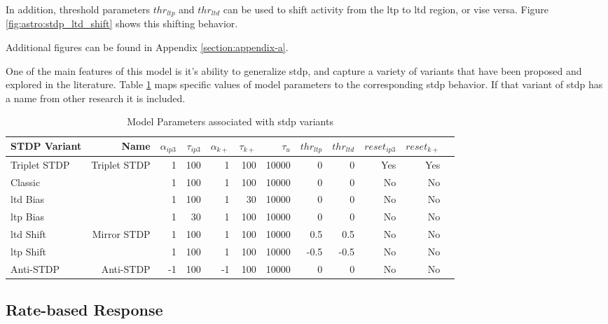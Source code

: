 
In addition, threshold parameters $thr_{ltp}$ and $thr_{ltd}$ can be used to
shift activity from the \gls{ltp} to \gls{ltd} region, or vise versa. Figure
\ref{fig:astro:stdp_ltd_shift} shows this shifting behavior.


Additional figures can be found in Appendix \ref{section:appendix-a}.

One of the main features of this model is it's ability to generalize \gls{stdp},
and capture a variety of variants that have been proposed and explored in the
literature. Table \ref{table:astro_varient_params} maps specific values of
model parameters to the corresponding \gls{stdp} behavior. If that
variant of \gls{stdp} has a name from other research it is included.

\begin{table}[!htp]\centering
\caption{Model Parameters associated with \gls{stdp} variants} \label{table:astro_varient_params}
\scriptsize
\begin{tabular}{lrrrrrrrrrrr}\toprule
STDP Variant &Name &$\alpha_{ip3}$ &$\tau_{ip3}$ &$\alpha_{k+}$ &$\tau_{k+}$ &$\tau_u$ &$thr_{ltp}$ &$thr_{ltd}$ &$reset_{ip3}$ &$reset_{k+}$ \\\midrule
Triplet STDP &Triplet STDP &1 &100 &1 &100 &10000 &0 &0 &Yes &Yes \\
Classic & &1 &100 &1 &100 &10000 &0 &0 &No &No \\
\Gls{ltd} Bias & &1 &100 &1 &30 &10000 &0 &0 &No &No \\
\Gls{ltp} Bias & &1 &30 &1 &100 &10000 &0 &0 &No &No \\
\Gls{ltd} Shift &Mirror STDP &1 &100 &1 &100 &10000 &0.5 &0.5 &No &No \\
\Gls{ltp} Shift & &1 &100 &1 &100 &10000 &-0.5 &-0.5 &No &No \\
Anti-STDP &Anti-STDP &-1 &100 &-1 &100 &10000 &0 &0 &No &No \\
\bottomrule
\end{tabular}
\end{table}

\subsection{Rate-based Response} \label{sec:rate_response}

